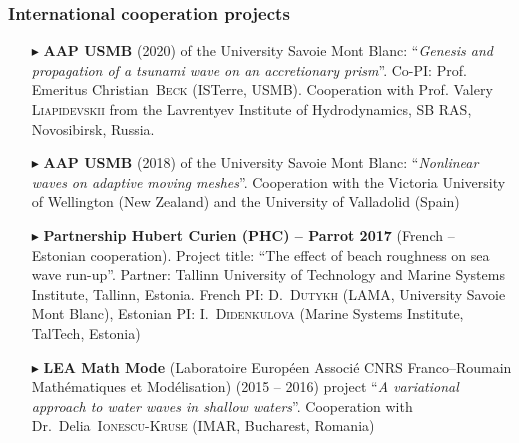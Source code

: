 \separator
\subsubsection{International cooperation projects}

\begin{itemize}

  \item[$\blacktriangleright$] \textbf{AAP USMB} (2020) of the University Savoie Mont Blanc: ``\textit{Genesis and propagation of a tsunami wave on an accretionary prism}''. Co-PI: Prof. Emeritus Christian~\textsc{Beck} (ISTerre, USMB). Cooperation with Prof. Valery \textsc{Liapidevskii} from the Lavrentyev Institute of Hydrodynamics, SB RAS, Novosibirsk, Russia.

  \item[$\blacktriangleright$] \textbf{AAP USMB} (2018) of the University Savoie Mont Blanc: ``\textit{Nonlinear waves on adaptive moving meshes}''. Cooperation with the Victoria University of Wellington (New Zealand) and the University of Valladolid (Spain)

  \item[$\blacktriangleright$] \textbf{Partnership Hubert Curien (PHC) -- Parrot 2017} (French -- Estonian cooperation). Project title: ``The effect of beach roughness on sea wave run-up''. Partner: Tallinn University of Technology and Marine Systems Institute, Tallinn, Estonia. French PI: D.~\textsc{Dutykh} (LAMA, University Savoie Mont Blanc), Estonian PI: I.~\textsc{Didenkulova} (Marine Systems Institute, TalTech, Estonia)

  \item[$\blacktriangleright$] \textbf{LEA Math Mode} (Laboratoire Europ\'een Associ\'e CNRS Franco--Roumain Math\'e\-matiques et Mod\'elisation) (2015 -- 2016) project ``\textit{A variational approach to water waves in shallow waters}''. Cooperation with Dr.~Delia~\textsc{Ionescu-Kruse} (IMAR, Bucharest, Romania)
  

\end{itemize}
